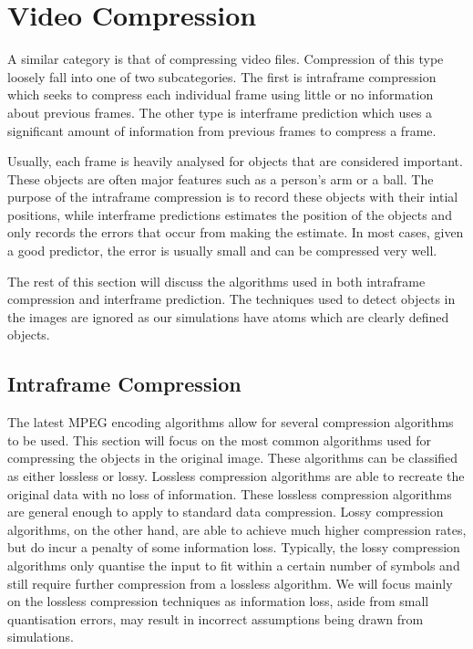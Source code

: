 \documentclass[a4paper,11pt]{report}
\begin{document}
\section{Video Compression}

A similar category is that of compressing video files. Compression of this type loosely fall into one of two subcategories. The first is intraframe compression which seeks to compress each individual frame using little or no information about previous frames. The other type is interframe prediction which uses a significant amount of information from previous frames to compress a frame. 

Usually, each frame is heavily analysed for objects that are considered important. These objects are often major features such as a person's arm or a ball. The purpose of the intraframe compression is to record these objects with their intial positions, while interframe predictions estimates the position of the objects and only records the errors that occur from making the estimate. In most cases, given a good predictor, the error is usually small and can be compressed very well.

The rest of this section will discuss the algorithms used in both intraframe compression and interframe prediction. The techniques used to detect objects in the images are ignored as our simulations have atoms which are clearly defined objects.

\subsection{Intraframe Compression}
\label{back_intra}

The latest MPEG encoding algorithms allow for several compression algorithms to be used\cite{gall1991mvc}. This section will focus on the most common algorithms used for compressing the objects in the original image. These algorithms can be classified as either lossless or lossy. Lossless compression algorithms are able to recreate the original data with no loss of information. These lossless compression algorithms are general enough to apply to standard data compression. Lossy compression algorithms, on the other hand, are able to achieve much higher compression rates, but do incur a penalty of some information loss. Typically, the lossy compression algorithms only quantise the input to fit within a certain number of symbols and still require further compression from a lossless algorithm. We will focus mainly on the lossless compression techniques as information loss, aside from small quantisation errors, may result in incorrect assumptions being drawn from simulations.  
\end{document}
